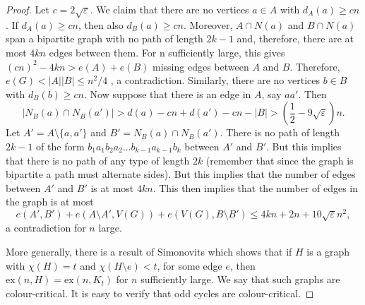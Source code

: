 \documentclass[12pt]{article}
\newcommand{\ex}{\mathrm{ex}}
\begin{document}
\begin{proof}
	Let $c=2\sqrt{\varepsilon}$. We claim that there are no vertices $a\in A$ with $d_A(a)\geq cn$. If $d_A(a)\geq cn$, then also $d_B(a) \geq cn$. Moreover, $A\cap N(a)$ and $B\cap N(a)$ span a bipartite graph with no path of length $2k - 1$ and, therefore, there are at most $4kn$ edges between them. For n sufficiently large, this gives $(cn)^2 - 4kn > e(A) + e(B)$ missing edges between $A$ and $B$. Therefore, $e(G) < |A||B| \leq n^2/4$ , a contradiction. Similarly, there are no vertices $b\in B$ with $d_B(b) \geq cn$. Now suppose that there is an edge in $A$, say $aa'$. Then
	$$|N_B(a)\cap N_B(a')|> d(a)-cn+d(a')-cn-|B|>\left(\frac{1}{2}-9\sqrt{\varepsilon}\right)n.$$
	Let $A'=A\setminus\{a,a'\}$ and $B'=N_B(a)\cap N_B(a')$. There is no path of length $2k - 1$ of the form $b_1a_1b_2a_2 \dots b_{k-1}a_{k-1}b_k$ between $A'$ and $B'$. But this implies that there is no path of any type of length $2k$ (remember that since the graph is bipartite a path must alternate sides). But this implies that the number of edges between $A'$ and $B'$ is at most $4kn$. This then implies that the number of edges in the graph is at most
	$$e(A', B') + e(A\setminus A', V (G)) + e(V (G), B\setminus B') \leq 4kn + 2n + 10\sqrt{\varepsilon}n^2,$$
	a contradiction for $n$ large.

	More generally, there is a result of Simonovits which shows that if $H$ is a graph with $\chi(H) = t$ and $\chi(H\setminus e) < t$, for some edge $e$, then $\ex(n, H) = \ex(n, K_t)$ for $n$ sufficiently large. We say that such graphs are colour-critical. It is easy to verify that odd cycles are colour-critical.
\end{proof}
\end{document}
